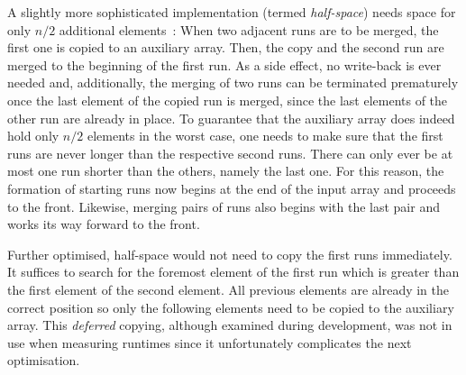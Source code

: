 A slightly more sophisticated implementation (termed \emph{half-space}) needs space for only \(n/2\) additional elements~\cite[Chapter~2.5]{lang2009algorithmen}:
When two adjacent runs are to be merged, the first one is copied to an auxiliary array.
Then, the copy and the second run are merged to the beginning of the first run.
As a side effect, no write-back is ever needed and, additionally, the merging of two runs can be terminated prematurely once the last element of the copied run is merged, since the last elements of the other run are already in place.
To guarantee that the auxiliary array does indeed hold only \(n/2\) elements in the worst case, one needs to make sure that the first runs are never longer than the respective second runs.
There can only ever be at most one run shorter than the others, namely the last one.
For this reason, the formation of starting runs now begins at the end of the input array and proceeds to the front.
Likewise, merging pairs of runs also begins with the last pair and works its way forward to the front.

Further optimised, half-space \MS{} would not need to copy the first runs immediately.
It suffices to search for the foremost element of the first run which is greater than the first element of the second element.
All previous elements are already in the correct position so only the following elements need to be copied to the auxiliary array.
This \emph{deferred} copying, although examined during development, was not in use when measuring runtimes since it unfortunately complicates the next optimisation.


